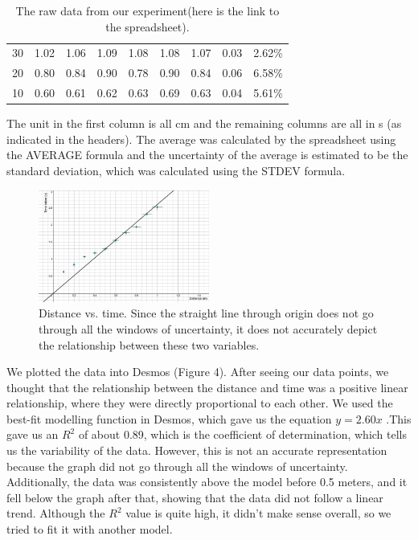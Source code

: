 \documentclass[12pt]{report}
\begin{document}
\begin{table}[]
\begin{tabular}{ccccccccc}
        30                                                 & 1.02                                             & 1.06    & 1.09    & 1.08    & 1.08    & 1.07                  & 0.03                   & 2.62\%                  \\
        20                                                 & 0.80                                             & 0.84    & 0.90    & 0.78    & 0.90    & 0.84                  & 0.06                   & 6.58\%                  \\
        10                                                 & 0.60                                             & 0.61    & 0.62    & 0.63    & 0.69    & 0.63                  & 0.04                   & 5.61\%
    \end{tabular}
    \caption{The raw data from our experiment(here is the link to the spreadsheet).}
\end{table}
The unit in the first column is all cm and the remaining columns are all in s (as indicated in the headers). The average was calculated by the spreadsheet using the AVERAGE formula and the uncertainty of the average is estimated to be the standard deviation, which was calculated using the STDEV formula.
\begin{figure}
    \centering
    \includegraphics[width=0.5\textwidth]{graph.png}
    \caption{Distance vs. time. Since the straight line through origin does not go through all the windows of uncertainty, it does not accurately depict the relationship between these two variables. }
\end{figure}
\newline
We plotted the data into Desmos (Figure 4). After seeing our data points, we thought that the relationship between the distance and time was a positive linear relationship, where they were directly proportional to each other. We used the best-fit modelling function in Desmos, which gave us the equation $y=2.60x$ .This gave us an $R^2$ of about 0.89, which is the coefficient of determination, which tells us the variability of the data. However, this is not an accurate representation because the graph did not go through all the windows of uncertainty. Additionally, the data was consistently above the model before 0.5 meters, and it fell below the graph after that, showing that the data did not follow a linear trend. Although the $R^2$ value is quite high, it didn’t make sense overall, so we tried to fit it with another model.
\end{document}
